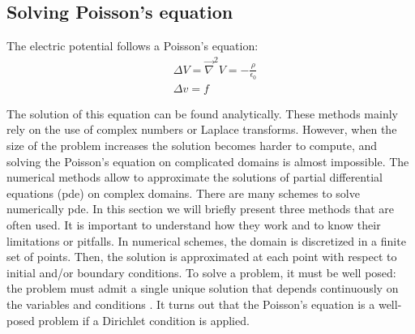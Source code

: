 \begin{refsection}
	\subsection{Solving Poisson's equation}
	The electric potential follows a Poisson's equation:
	\begin{align}
		 & \Delta V = \vec{\nabla}^{2}V = -\frac{\rho}{\epsilon_{0}} \\
		 & \Delta v = f
	\end{align}

	The solution of this equation can be found analytically. These methods mainly rely on the use of complex numbers or Laplace transforms. However, when the size of the problem increases the solution becomes harder to compute, and solving the Poisson's equation on complicated domains is almost impossible. The numerical methods allow to approximate the solutions of partial differential equations (\acrshort{pde}) on complex domains. There are many schemes to solve numerically \acrshort{pde}. In this section we will briefly present three methods that are often used. It is important to understand how they work and to know their limitations or pitfalls. In numerical schemes, the domain is discretized in a finite set of points. Then, the solution is approximated at each point with respect to initial and/or boundary conditions. To solve a problem, it must be well posed: the problem must admit a single unique solution that depends continuously on the variables and conditions \cite{Hadamard1902}. It turns out that the Poisson's equation is a well-posed problem if a Dirichlet condition is applied.


\end{refsection}
